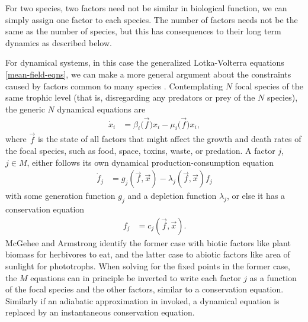 \documentclass[a4paper,10pt]{article}
\numberwithin{equation}{section} %
\begin{document}
For two species, two factors need not be similar in biological function, we can simply assign one factor to each species. 
The number of factors needs not be the same as the number of species, but this has consequences to their long term dynamics as described below. 

For dynamical systems, in this case the generalized Lotka-Volterra equations \ref{mean-field-eqns}, we can make a more general argument about the constraints caused by factors common to many species \cite{Armstrong1976,McGehee1977a}. 
Contemplating $N$ focal species of the same trophic level (that is, disregarding any predators or prey of the $N$ species), the generic $N$ dynamical equations are
\begin{align*}
\dot{x}_i &= \beta_i\big(\vec{f}\big)x_i - \mu_i\big(\vec{f}\big) x_i,
\end{align*}
where $\vec{f}$ is the state of all factors that might affect the growth and death rates of the focal species, such as food, space, toxins, waste, or predation. 
A factor $j$, $j \in M$, either follows its own dynamical production-consumption equation
\begin{align*}
\dot{f}_j &= g_j(\vec{f},\vec{x}) - \lambda_j(\vec{f},\vec{x}) f_j
\end{align*}
with some generation function $g_j$ and a depletion function $\lambda_j$,
or else it has a conservation equation
\begin{align*}
f_j &= c_j(\vec{f},\vec{x}).
\end{align*}
McGehee and Armstrong identify the former case with biotic factors like plant biomass for herbivores to eat, and the latter case to abiotic factors like area of sunlight for phototrophs. 
When solving for the fixed points in the former case, the $M$ equations can in principle be inverted to write each factor $j$ as a function of the focal species and the other factors, similar to a conservation equation. 
Similarly if an adiabatic approximation in invoked, a dynamical equation is replaced by an instantaneous conservation equation. 
\end{document}
